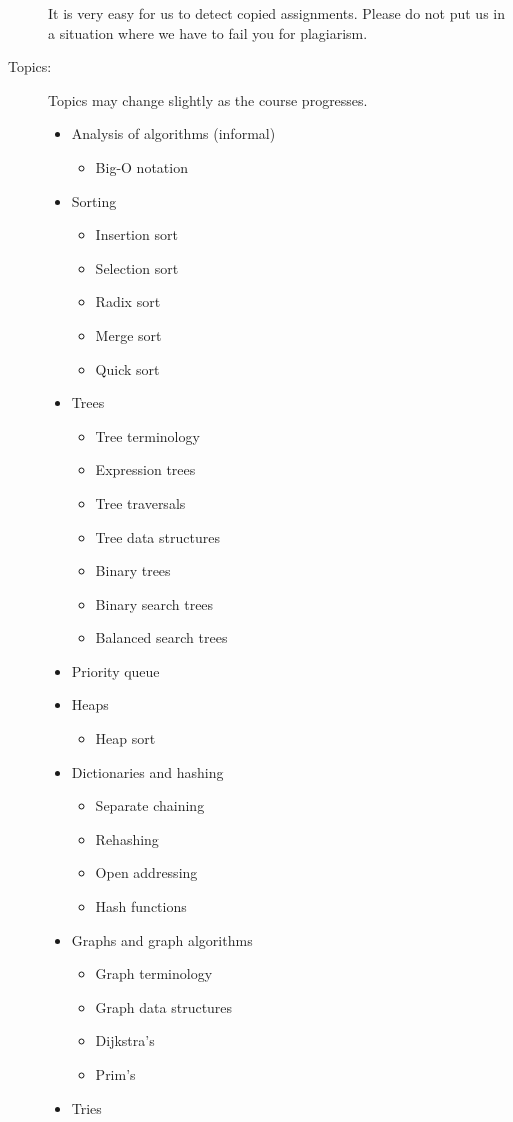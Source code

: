 \documentclass{article}
\begin{document}
\begin{description}
  It is very easy for us to detect copied assignments.  Please do not
  put us in a situation where we have to fail you for plagiarism.

\item[Topics:] Topics may change slightly as the course progresses.

  \begin{itemize}
  \item Analysis of algorithms (informal)
    \begin{itemize}
    \item Big-O notation
    \end{itemize}
  \item Sorting
    \begin{itemize}
    \item Insertion sort
    \item Selection sort
    \item Radix sort
    \item Merge sort
    \item Quick sort
    \end{itemize}
  \item Trees
    \begin{itemize}
    \item Tree terminology
    \item Expression trees
    \item Tree traversals
    \item Tree data structures
    \item Binary trees
    \item Binary search trees
    \item Balanced search trees
    \end{itemize}
  \item Priority queue
  \item Heaps
    \begin{itemize}
    \item Heap sort
    \end{itemize}
  \item Dictionaries and hashing
    \begin{itemize}
    \item Separate chaining
    \item Rehashing
    \item Open addressing
    \item Hash functions
    \end{itemize}
  \item Graphs and graph algorithms
    \begin{itemize}
    \item Graph terminology
    \item Graph data structures
    \item Dijkstra's 
    \item Prim's
    \end{itemize}
  \item Tries
  \end{itemize}
  
    


\end{description}
\end{document}
